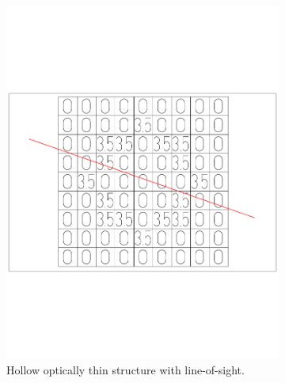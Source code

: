 \begin{figure}\centering
    \begin{subfigure}[t]{0.45\linewidth}\centering
        \includegraphics[width=\linewidth,trim=50 200 50 200,clip]{gfx/circle}
        \caption{Hollow optically thin structure with line-of-sight.}		
    \end{subfigure}
    \begin{subfigure}[t]{0.45\linewidth}\centering

\end{subfigure}
\end{figure}
